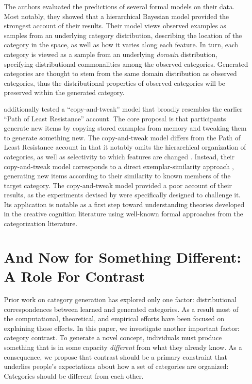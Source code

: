\documentclass[12pt]{article}
\begin{document}
\begin{flushleft}
The authors evaluated the predictions of several formal models on their data.
Most notably, they showed that a hierarchical Bayesian model provided the
strongest account of their results. Their model views observed examples as
samples from an underlying category distribution, describing the location of the
category in the space, as well as how it varies along each feature. In turn,
each category is viewed as a sample from an underlying {\em domain}
distribution, specifying distributional commonalities among the observed
categories. Generated categories are thought to stem from the same domain
distribution as observed categories, thus the distributional properties of
observed categories will be preserved within the generated category. 

\cite{jern2013probabilistic} additionally tested a ``copy-and-tweak'' model that
broadly resembles the earlier ``Path of Least Resistance'' account. The core
proposal is that participants generate new items by copying stored examples from
memory and tweaking them to generate something new. The copy-and-tweak model
differs from the Path of Least Resistance account in that it notably omits the
hierarchical organization of categories, as well as selectivity to which
features are changed \citep[both of which are factors in the Path of Least
Resistance account;][]{ward2002role}. Instead, their copy-and-tweak model
corresponds to a direct exemplar-similarity approach
\citep[e.g.,][]{nosofsky1984choice,nosofsky1986attention}, generating new items
according to their similarity to known members of the target category. The
copy-and-tweak model provided a poor account of their results, as the
experiments devised by \citeauthor{jern2013probabilistic} were specifically
designed to challenge it. Its application is notable as a first step
toward understanding theories developed in the creative cognition literature
using well-known formal approaches from the categorization literature.


\section{And Now for Something Different: A Role For Contrast}

Prior work on category generation has explored only one factor: distributional
correspondences between learned and generated categories. As a result most of
the computational, theoretical, and empirical efforts have been focused on
explaining those effects. In this paper, we investigate another important
factor: category contrast. To generate a novel concept, individuals must produce
something that is in some capacity {\em different} from what they already know.
As a consequence, we propose that contrast should be a primary constraint that
underlies people's expectations about how a set of categories are organized: Categories should be different from each other. 


\end{flushleft}
\end{document}
